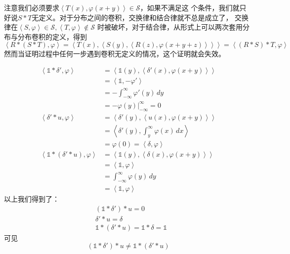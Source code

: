\documentclass{ctexbook}
\newcommand{\evalat}[3]{\left.#1\right|_{#2}^{#3}}
\begin{document}
注意我们必须要求$\left\langle T(x),\varphi(x+y)\right\rangle\in\mathcal{S}$，如果不满足这
个条件，我们就只好说$S*T$无定义。对于分布之间的卷积，交换律和结合律就不总是成立了，
交换律在$\left\langle S,\varphi\right\rangle\in\mathcal{S} ,\left\langle T,\varphi\right\rangle\notin\mathcal{S}$
时被破坏，对于结合律，从形式上可以两次套用分布与分布卷积的定义，得到
\begin{equation*}
    \left\langle R*(S*T),\varphi\right\rangle=\left\langle T(x),\left\langle S(y),\left\langle R(z),\varphi(x+y+z)\right\rangle\right\rangle\right\rangle=\left\langle (R*S)*T,\varphi\right\rangle
\end{equation*}
然而当证明过程中任何一步遇到卷积无定义的情况，这个证明就会失效。
\begin{example}[结合律的失效]
\begin{align*}
    \left\langle\mathds{1}*\delta',\varphi\right\rangle& =\left\langle \mathds{1}(y),\left\langle \delta'(x),\varphi(x+y)\right\rangle\right\rangle\\
    &=\left\langle \mathds{1},-\varphi'\right\rangle\\
    &=-\int_{-\infty}^{\infty}\varphi'(y)\,dy\\
    &=-\evalat{\varphi(y)}{-\infty}{\infty}=0\\
    \left\langle \delta'*u,\varphi\right\rangle&=\left\langle \delta'(y),\left\langle u(x),\varphi(x+y)\right\rangle\right\rangle\\
    &=\left\langle \delta'(y),\int_{y}^{\infty}\varphi(x)\,dx\right\rangle\\
    &=\varphi(0)=\left\langle \delta,\varphi\right\rangle\\
    \left\langle\mathds{1}*(\delta'*u),\varphi\right\rangle&=\left\langle \mathds{1}(y),\left\langle \delta(x),\varphi(x+y)\right\rangle\right\rangle\\
    &=\left\langle \mathds{1},\varphi\right\rangle\\
    &=\int_{-\infty}^{\infty}\varphi(y)\,dy\\
    & =\left\langle \mathds{1},\varphi\right\rangle 
\end{align*}
以上我们得到了：\begin{align*}
    &(\mathds{1}*\delta')*u=0\\
    &\delta'*u=\delta\\
    &\mathds{1}*(\delta'*u)=\mathds{1}*\delta=\mathds{1}
\end{align*}
可见\begin{equation*}
    (\mathds{1}*\delta')*u                       \neq\mathds{1}*(\delta'*u)
\end{equation*}
\end{example}
\end{document}
